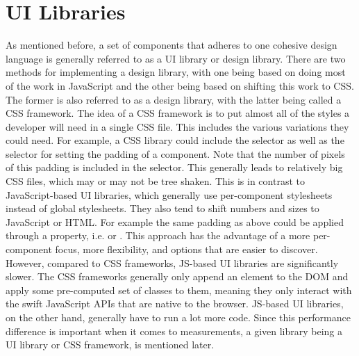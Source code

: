 \section{UI Libraries}\label{sec:bg:ui-libraries}
As mentioned before, a set of components that adheres to one cohesive design language is generally referred to as a UI library or design library. There are two methods for implementing a design library, with one being based on doing most of the work in JavaScript and the other being based on shifting this work to CSS. The former is also referred to as a design library, with the latter being called a CSS framework. The idea of a CSS framework is to put almost all of the styles a developer will need in a single CSS file. This includes the various variations they could need. For example, a CSS library could include the  selector as well as the  selector for setting the padding of a component. Note that the number of pixels of this padding is included in the selector. This generally leads to relatively big CSS files, which may or may not be tree shaken. This is in contrast to JavaScript-based UI libraries, which generally use per-component stylesheets instead of global stylesheets. They also tend to shift numbers and sizes to JavaScript or HTML\@. For example the same padding as above could be applied through a property, i.e.  or . This approach has the advantage of a more per-component focus, more flexibility, and options that are easier to discover. However, compared to CSS frameworks, JS-based UI libraries are significantly slower. The CSS frameworks generally only append an element to the DOM and apply some pre-computed set of classes to them, meaning they only interact with the swift JavaScript APIs that are native to the browser. JS-based UI libraries, on the other hand, generally have to run a lot more code. Since this performance difference is important when it comes to measurements, a given library being a UI library or CSS framework, is mentioned later.
